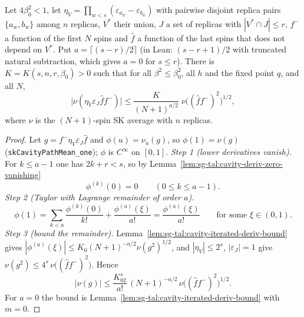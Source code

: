 \begin{corollary}\label{cor:sg-tal:eta-coupled-bound}
\leanok
{}
Let $4\beta_0^2<1$, let $\eta_V=\prod_{w<s}(\varepsilon_{a_w}-\varepsilon_{b_w})$ with pairwise disjoint replica pairs $\{a_w,b_w\}$ among $n$ replicas, $V^*$ their union, $J$ a set of replicas with $|V^*\cap J|\le r$, $f^-$ a function of the first $N$ spins and $\hat f$ a function of the last spins that does not depend on $V^*$. Put $a=\lceil (s-r)/2\rceil$ (in Lean: $(s-r+1)/2$ with truncated natural subtraction, which gives $a=0$ for $s\le r$). There is $K=K(s,n,r,\beta_0)>0$ such that for all $\beta^2\le\beta_0^2$, all $h$ and the fixed point $q$, and all $N$,
\[
\bigl|\nu(\eta_V\varepsilon_J\hat f f^-)\bigr|\le \frac{K}{(N+1)^{a/2}}\;\nu\bigl((\hat f f^-)^2\bigr)^{1/2},
\]
where $\nu$ is the $(N+1)$-spin SK average with $n$ replicas.
\end{corollary}
\begin{proof}
\leanok
Let $g=f^-\eta_V\varepsilon_J\hat f$ and $\phi(u)=\nu_u(g)$, so $\phi(1)=\nu(g)$ (\texttt{skCavityPathMean\_one}); $\phi$ is $C^\infty$ on $[0,1]$.
\emph{Step 1 (lower derivatives vanish).} For $k\le a-1$ one has $2k+r<s$, so by Lemma~\ref{lem:sg-tal:cavity-deriv-zero-vanishing}
\[
\phi^{(k)}(0)=0\qquad(0\le k\le a-1).
\]
\emph{Step 2 (Taylor with Lagrange remainder of order $a$).}
\[
\phi(1)=\sum_{k<a}\frac{\phi^{(k)}(0)}{k!}+\frac{\phi^{(a)}(\xi)}{a!}=\frac{\phi^{(a)}(\xi)}{a!}\qquad\text{for some }\xi\in(0,1).
\]
\emph{Step 3 (bound the remainder).} Lemma~\ref{lem:sg-tal:cavity-iterated-deriv-bound} gives $|\phi^{(a)}(\xi)|\le K_0(N+1)^{-a/2}\nu(g^2)^{1/2}$, and $|\eta_V|\le2^s$, $|\varepsilon_J|=1$ give $\nu(g^2)\le4^s\,\nu\big((\hat ff^-)^2\big)$. Hence
\[
|\nu(g)|\le\frac{K_02^s}{a!}\,(N+1)^{-a/2}\,\nu\big((\hat ff^-)^2\big)^{1/2}.
\]
For $a=0$ the bound is Lemma~\ref{lem:sg-tal:cavity-iterated-deriv-bound} with $m=0$.
\end{proof}

